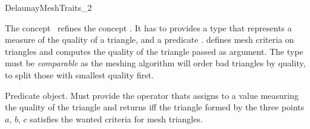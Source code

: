 \begin{ccRefConcept}{DelaunayMeshTraits_2}

\ccDefinition

The concept \ccRefName\ refines the concept
. It has to provides a
type  that represents a measure of the quality of a
triangle, and a predicate .   defines mesh
criteria on triangles and computes the quality of the triangle passed
as argument. The type  must be \emph{comparable} as the
meshing algorithm will order bad triangles by quality, to split those
with smallest quality first.

\ccRefines


\ccTypes


 {Predicate object. Must provide the operator
  thats assigns to  a value measuring the quality of the
  triangle and returns  iff the triangle formed by the three
  points $a$, $b$, $c$ satisfies the wanted criteria for mesh
  triangles.}




\ccHasModels
{}\\

\end{ccRefConcept}


